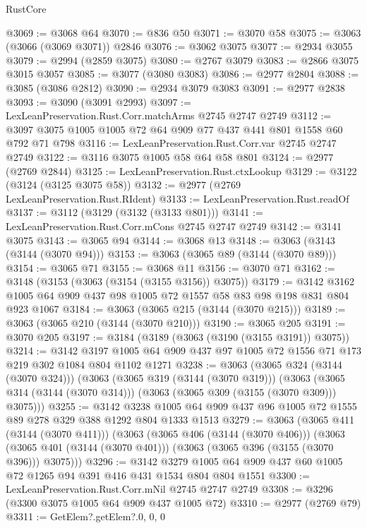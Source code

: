 \begin{lexlean}{RustCore}
\begin{coremodule}
@3069 := @3068 @64
@3070 := @836 @50
@3071 := @3070 @58
@3075 := @3063 (@3066 (@3069 @3071)) @2846
@3076 := @3062 @3075
@3077 := @2934 @3055
@3079 := @2994 (@2859 @3075)
@3080 := @2767 @3079
@3083 := @2866 @3075 @3015 @3057
@3085 := @3077 (@3080 @3083)
@3086 := @2977 @2804
@3088 := @3085 (@3086 @2812)
@3090 := @2934 @3079 @3083
@3091 := @2977 @2838
@3093 := @3090 (@3091 @2993)
@3097 := LexLeanPreservation.Rust.Corr.matchArms @2745 @2747 @2749
@3112 := @3097 @3075 @1005 @1005 @72 @64 @909 @77 @437 @441 @801 @1558 @60 @792 @71 @798
@3116 := LexLeanPreservation.Rust.Corr.var @2745 @2747 @2749
@3122 := @3116 @3075 @1005 @58 @64 @58 @801
@3124 := @2977 (@2769 @2844)
@3125 := LexLeanPreservation.Rust.ctxLookup
@3129 := @3122 (@3124 (@3125 @3075 @58))
@3132 := @2977 (@2769 LexLeanPreservation.Rust.RIdent)
@3133 := LexLeanPreservation.Rust.readOf
@3137 := @3112 (@3129 (@3132 (@3133 @801)))
@3141 := LexLeanPreservation.Rust.Corr.mCons @2745 @2747 @2749
@3142 := @3141 @3075
@3143 := @3065 @94
@3144 := @3068 @13
@3148 := @3063 (@3143 (@3144 (@3070 @94)))
@3153 := @3063 (@3065 @89 (@3144 (@3070 @89)))
@3154 := @3065 @71
@3155 := @3068 @11
@3156 := @3070 @71
@3162 := @3148 (@3153 (@3063 (@3154 (@3155 @3156)) @3075))
@3179 := @3142 @3162 @1005 @64 @909 @437 @98 @1005 @72 @1557 @58 @83 @98 @198 @831 @804 @923 @1067
@3184 := @3063 (@3065 @215 (@3144 (@3070 @215)))
@3189 := @3063 (@3065 @210 (@3144 (@3070 @210)))
@3190 := @3065 @205
@3191 := @3070 @205
@3197 := @3184 (@3189 (@3063 (@3190 (@3155 @3191)) @3075))
@3214 := @3142
    @3197
    @1005
    @64
    @909
    @437
    @97
    @1005
    @72
    @1556
    @71
    @173
    @219
    @302
    @1084
    @804
    @1102
    @1271
@3238 := @3063
    (@3065 @324 (@3144 (@3070 @324)))
    (@3063
      (@3065 @319 (@3144 (@3070 @319)))
      (@3063 (@3065 @314 (@3144 (@3070 @314))) (@3063 (@3065 @309 (@3155 (@3070 @309))) @3075)))
@3255 := @3142
    @3238
    @1005
    @64
    @909
    @437
    @96
    @1005
    @72
    @1555
    @89
    @278
    @329
    @388
    @1292
    @804
    @1333
    @1513
@3279 := @3063
    (@3065 @411 (@3144 (@3070 @411)))
    (@3063
      (@3065 @406 (@3144 (@3070 @406)))
      (@3063 (@3065 @401 (@3144 (@3070 @401))) (@3063 (@3065 @396 (@3155 (@3070 @396))) @3075)))
@3296 := @3142
    @3279
    @1005
    @64
    @909
    @437
    @60
    @1005
    @72
    @1265
    @94
    @391
    @416
    @431
    @1534
    @804
    @804
    @1551
@3300 := LexLeanPreservation.Rust.Corr.mNil @2745 @2747 @2749
@3308 := @3296 (@3300 @3075 @1005 @64 @909 @437 @1005 @72)
@3310 := @2977 (@2769 @79)
@3311 := GetElem?.getElem?.{0, 0, 0}

\end{coremodule}
\end{lexlean}
